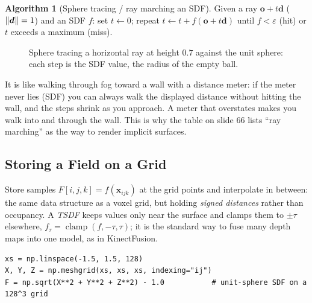 \documentclass[11pt,a4paper]{article}
\newcommand{\vx}{\bm{x}}
\newcommand{\vo}{\bm{o}}
\newcommand{\vd}{\bm{d}}
\newcommand{\x}{{\bm{x}}}
\DeclareMathOperator{\clamp}{clamp}
\theoremstyle{definition}
\newtheorem{algorithm}{Algorithm}[section]
\theoremstyle{plain}
\theoremstyle{remark}
\begin{document}
\begin{algorithm}[Sphere tracing / ray marching an SDF]
Given a ray $\vo+t\vd$ ($\norm{\vd}=1$) and an SDF $f$: set $t\leftarrow0$; repeat $t\leftarrow t+f(\vo+t\vd)$ until $f<\varepsilon$ (hit) or $t$ exceeds a maximum (miss).
\end{algorithm}

\begin{figure}[ht]
\centering
{}
\caption{Sphere tracing a horizontal ray at height $0.7$ against the unit sphere: each step is the SDF value, the radius of the empty ball.}
\end{figure}

\begin{intuition}
It is like walking through fog toward a wall with a distance meter: if the meter never lies (SDF) you can always walk the displayed distance without hitting the wall, and the steps shrink as you approach. A meter that overstates makes you walk into and through the wall. This is why the table on slide 66 lists ``ray marching'' as the way to render implicit surfaces.
\end{intuition}

\subsection{Storing a Field on a Grid }
Store samples $F[i,j,k]=f(\vx_{ijk})$ at the grid points and interpolate in between: the same data structure as a voxel grid, but holding \emph{signed distances} rather than occupancy. A \emph{TSDF} keeps values only near the surface and clamps them to $\pm\tau$ elsewhere, $f_\tau=\clamp(f,-\tau,\tau)$; it is the standard way to fuse many depth maps into one model, as in KinectFusion.
\begin{lstlisting}
xs = np.linspace(-1.5, 1.5, 128)
X, Y, Z = np.meshgrid(xs, xs, xs, indexing="ij")
F = np.sqrt(X**2 + Y**2 + Z**2) - 1.0           # unit-sphere SDF on a 128^3 grid
\end{lstlisting}
\end{document}
